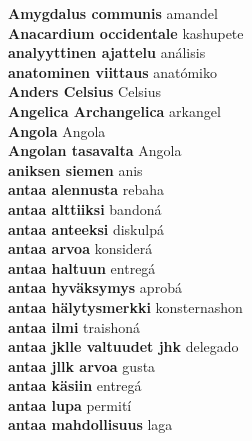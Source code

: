 \textbf{ Amygdalus communis  } amandel \\
\textbf{ Anacardium occidentale  } kashupete \\
\textbf{ analyyttinen ajattelu  } análisis \\
\textbf{ anatominen viittaus  } anatómiko \\
\textbf{ Anders Celsius  } Celsius \\
\textbf{ Angelica Archangelica  } arkangel \\
\textbf{ Angola  } Angola \\
\textbf{ Angolan tasavalta  } Angola \\
\textbf{ aniksen siemen  } anis \\
\textbf{ antaa alennusta  } rebaha \\
\textbf{ antaa alttiiksi  } bandoná \\
\textbf{ antaa anteeksi  } diskulpá \\
\textbf{ antaa arvoa  } konsiderá \\
\textbf{ antaa haltuun  } entregá \\
\textbf{ antaa hyväksymys  } aprobá \\
\textbf{ antaa hälytysmerkki  } konsternashon \\
\textbf{ antaa ilmi  } traishoná \\
\textbf{ antaa jklle valtuudet jhk  } delegado \\
\textbf{ antaa jllk arvoa  } gusta \\
\textbf{ antaa käsiin  } entregá \\
\textbf{ antaa lupa  } permití \\
\textbf{ antaa mahdollisuus  } laga \\
